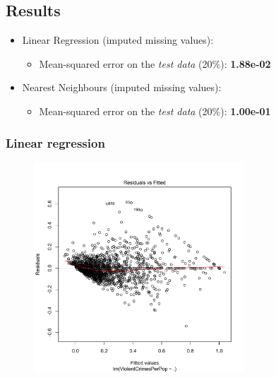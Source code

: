 \documentclass[12pt,a4paper]{article}
\begin{document}
\begin{singlespace}



\subsection{Results}
\begin{itemize}
    \item Linear Regression (imputed missing values):
    \begin{itemize}
        \item Mean-squared error on the \emph{test data} (20\%): \textbf{1.88e-02}
    \end{itemize}
    \item Nearest Neighbours (imputed missing values):
    \begin{itemize}
        \item Mean-squared error on the \emph{test data} (20\%): \textbf{1.00e-01}
    \end{itemize}
\end{itemize}

\subsubsection{Linear regression}
\vspace{-0.5cm}
\begin{figure}[h!]
    \centering
    \includegraphics[width=0.7\textwidth,trim= 0 0 20 30, clip]{Unk_linear_regression_residuals.pdf}
\end{figure}
\FloatBarrier


\end{singlespace}
\end{document}
